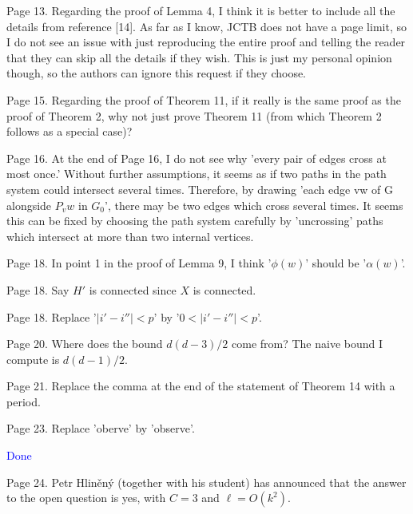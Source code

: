 \documentclass[12pt]{article}
\begin{document}
		Page 13.  Regarding the proof of Lemma 4, I think it is better to
		include all the details from reference [14].  As far as I know, JCTB
		does not have a page limit, so I do not see an issue with just
		reproducing the entire proof and telling the reader that they can skip
		all the details if they wish.  This is just my personal opinion
		though, so the authors can ignore this request if they choose.
		
		Page 15. Regarding the proof of Theorem 11, if it really is the same
		proof as the proof of Theorem 2, why not just prove Theorem 11 (from
		which Theorem 2 follows as a special case)?
		
		Page 16.  At the end of Page 16, I do not see why 'every pair of edges
		cross at most once.'  Without further assumptions, it seems as if two
		paths in the path system could intersect several times.  Therefore, by
		drawing 'each edge vw of G alongside $P_vw$ in $G_0$', there may be two
		edges which cross several times.  It seems this can be fixed by
		choosing the path system carefully by 'uncrossing' paths which
		intersect at more than two internal vertices.
		
		Page 18. In point 1 in the proof of Lemma 9, I think '$\phi(w)$' should
		be '$\alpha(w)$'.
		
		Page 18.  Say $H'$ is connected since $X$ is connected.
		
		Page 18.  Replace '$|i'-i''| < p$' by  '$0< |i'-i''| < p$'.
		
		Page 20.  Where does the bound $d(d-3)/2$ come from?  The naive bound I
		compute is $d(d-1)/2$.
		
		Page 21.  Replace the comma at the end of the statement of Theorem 14
		with a period.
		
		Page 23. Replace 'oberve' by 'observe'.
		
		\textcolor{blue}{Done}
		
		Page 24. Petr Hliněný (together with his student) has announced that
		the answer to the open question is yes, with $C=3$ and $\ell=O(k^2)$.
		
\end{document}
